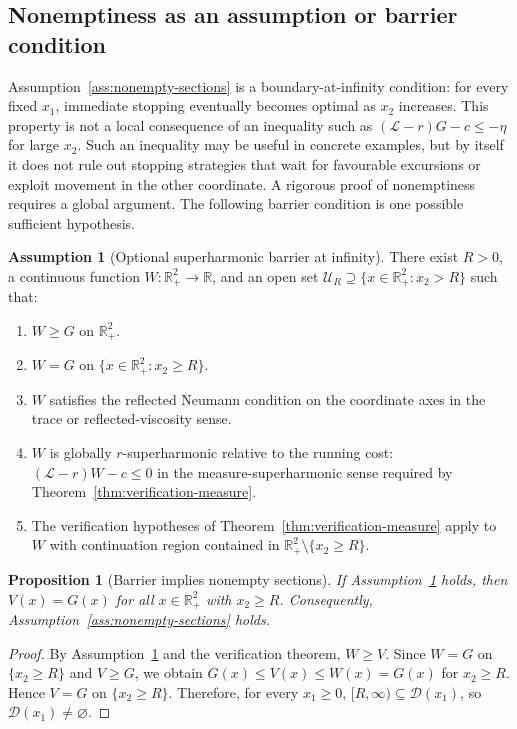 \documentclass[pdflatex,sn-mathphys-num]{sn-jnl}
\theoremstyle{plain}
\newtheorem{proposition}[theorem]{Proposition}
\theoremstyle{definition}
\newtheorem{assumption}[theorem]{Assumption}
\newcommand{\R}{\mathbb{R}}
\begin{document}
\subsection{Nonemptiness as an assumption or barrier condition}
\label{sec:nonemptiness}
Assumption~\ref{ass:nonempty-sections} is a boundary-at-infinity condition: for
every fixed $x_1$, immediate stopping eventually becomes optimal as $x_2$
increases. This property is not a local consequence of an inequality such as
$(\mathcal L-r)G-c\le -\eta$ for large $x_2$. Such an inequality may be useful
in concrete examples, but by itself it does not rule out stopping strategies
that wait for favourable excursions or exploit movement in the other
coordinate. A rigorous proof of nonemptiness requires a global argument. The
following barrier condition is one possible sufficient hypothesis.

\begin{assumption}[Optional superharmonic barrier at infinity]
\label{ass:barrier-infinity}
There exist $R>0$, a continuous function $W:\R^2_+\to\R$, and an open set
$\mathcal U_R\supseteq\{x\in\R^2_+:x_2>R\}$ such that:
\begin{enumerate}
\item[\textup{(B1)}] $W\ge G$ on $\R^2_+$.
\item[\textup{(B2)}] $W=G$ on $\{x\in\R^2_+:x_2\ge R\}$.
\item[\textup{(B3)}] $W$ satisfies the reflected Neumann condition on the
coordinate axes in the trace or reflected-viscosity sense.
\item[\textup{(B4)}] $W$ is globally $r$-superharmonic relative to the running
cost: $(\mathcal L-r)W-c\le0$ in the measure-superharmonic sense required by
Theorem~\ref{thm:verification-measure}.
\item[\textup{(B5)}] The verification hypotheses of
Theorem~\ref{thm:verification-measure} apply to $W$ with continuation region
contained in $\R^2_+\setminus\{x_2\ge R\}$.
\end{enumerate}
\end{assumption}

\begin{proposition}[Barrier implies nonempty sections]
\label{prop:barrier-nonempty}
If Assumption~\ref{ass:barrier-infinity} holds, then $V(x)=G(x)$ for all
$x\in\R^2_+$ with $x_2\ge R$. Consequently,
Assumption~\ref{ass:nonempty-sections} holds.
\end{proposition}
\begin{proof}
By Assumption~\ref{ass:barrier-infinity} and the verification theorem,
$W\ge V$. Since $W=G$ on $\{x_2\ge R\}$ and $V\ge G$, we obtain
$G(x)\le V(x)\le W(x)=G(x)$ for $x_2\ge R$. Hence $V=G$ on $\{x_2\ge R\}$.
Therefore, for every $x_1\ge0$, $[R,\infty)\subseteq\mathcal D(x_1)$, so
$\mathcal D(x_1)\ne\varnothing$.
\end{proof}
\end{document}
